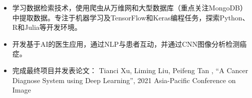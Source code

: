 \documentclass{resume}
\begin{document}

\begin{itemize}
  \item 学习数据检索技术，使用爬虫从万维网和大型数据库（重点关注MongoDB）中提取数据。专注于机器学习及TensorFlow和Keras编程任务，探索Python、R和Julia等开发环境。
  \item 开发基于AI的医生应用，通过NLP与患者互动，并通过CNN图像分析检测癌症。
  \item 完成最终项目并发表论文： Tianci Xu, Liming Liu, Peifeng Tan , “A Cancer Diagnose System using Deep Learning”, 2021 Asia-Pacific Conference on Image
\end{itemize}
\end{document}
